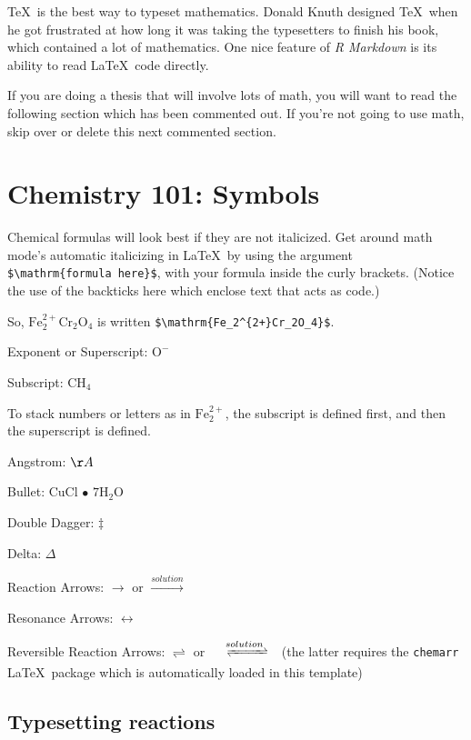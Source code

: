 \documentclass[12pt,twoside]{reedthesis}
\begin{document}
  \TeX~is the best way to typeset mathematics. Donald Knuth designed
  \TeX~when he got frustrated at how long it was taking the typesetters to
  finish his book, which contained a lot of mathematics. One nice feature
  of \emph{R Markdown} is its ability to read \LaTeX~code directly.
  
  If you are doing a thesis that will involve lots of math, you will want
  to read the following section which has been commented out. If you're
  not going to use math, skip over or delete this next commented section.
  
  \section{Chemistry 101: Symbols}\label{chemistry-101-symbols}
  
  Chemical formulas will look best if they are not italicized. Get around
  math mode's automatic italicizing in \LaTeX~by using the argument
  \texttt{\$\textbackslash{}mathrm\{formula\ here\}\$}, with your formula
  inside the curly brackets. (Notice the use of the backticks here which
  enclose text that acts as code.)
  
  So, \(\mathrm{Fe_2^{2+}Cr_2O_4}\) is written
  \texttt{\$\textbackslash{}mathrm\{Fe\_2\^{}\{2+\}Cr\_2O\_4\}\$}.
  
  \noindent Exponent or Superscript: \(\mathrm{O^-}\)
  
  \noindent Subscript: \(\mathrm{CH_4}\)
  
  To stack numbers or letters as in \(\mathrm{Fe_2^{2+}}\), the subscript
  is defined first, and then the superscript is defined.
  
  \noindent Angstrom: \({\AA}\)
  
  \noindent Bullet: CuCl \(\bullet\) \(\mathrm{7H_{2}O}\)
  
  \noindent Double Dagger: \(\ddag\)
  
  \noindent Delta: \(\Delta\)
  
  \noindent Reaction Arrows: \(\longrightarrow\) or
  \(\xrightarrow{solution}\)
  
  \noindent Resonance Arrows: \(\leftrightarrow\)
  
  \noindent Reversible Reaction Arrows: \(\rightleftharpoons\) or
  \(\xrightleftharpoons[ ]{solution}\) (the latter requires the
  \texttt{chemarr} \LaTeX~package which is automatically loaded in this
  template)
  
  \subsection{Typesetting reactions}\label{typesetting-reactions}
  
\end{document}
